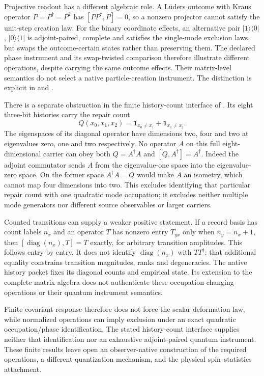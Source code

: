 Projective readout has a different algebraic role. A L\"uders outcome
with Kraus operator $P=P^\dagger=P^2$ has
$[PP^\dagger,P]=0$, so a nonzero projector cannot satisfy the unit-step
creation law. For the binary coordinate effects, an alternative pair
$|1\rangle\langle0|$, $|0\rangle\langle1|$ is adjoint-paired,
complete and satisfies the single-mode exclusion laws, but swaps the
outcome-certain states rather than preserving them. The declared phase
instrument and its swap-twisted comparison therefore illustrate
different operations, despite carrying the same outcome effects.
Their matrix-level semantics do not select a native particle-creation
instrument. The distinction is explicit in
 and
.

There is a separate obstruction in the finite history-count interface of
. Its eight three-bit histories
carry the repair count
\[
 Q(x_0,x_1,x_2)
  =\mathbf1_{x_0\ne x_1}+\mathbf1_{x_1\ne x_2}.
\]
The eigenspaces of its diagonal operator have dimensions two, four and
two at eigenvalues zero, one and two respectively. No operator $A$ on
this full eight-dimensional carrier can obey both
$Q=A^\dagger A$ and $[Q,A^\dagger]=A^\dagger$. Indeed the adjoint
commutator sends $A$ from the eigenvalue-one space into the eigenvalue-zero
space. On the former space $A^\dagger A=Q$ would make $A$ an isometry,
which cannot map four dimensions into two. This excludes identifying
that particular repair count with one quadratic mode occupation; it
excludes neither multiple mode generators nor different source
observables or larger carriers.

Counted transitions can supply a weaker positive statement. If a record
basis has count labels $n_x$ and an operator $T$ has nonzero entry
$T_{yx}$ only when $n_y=n_x+1$, then
$[\operatorname{diag}(n_x),T]=T$ exactly, for arbitrary transition
amplitudes. This follows entry by entry. It does not identify
$\operatorname{diag}(n_x)$ with $TT^\dagger$: that additional equality
constrains transition magnitudes, ranks and degeneracies. The native
history packet fixes its diagonal counts and empirical state. Its
extension to the complete matrix algebra does not authenticate these
occupation-changing operations or their quantum instrument semantics.

Finite covariant response therefore does not force the scalar deformation
law, while normalized operations
can imply exclusion under an exact quadratic occupation/phase
identification. The stated history-count interface supplies neither that identification
nor an exhaustive adjoint-paired quantum instrument. These finite
results leave open an observer-native construction of the required
operations, a different quantization mechanism, and the physical
spin--statistics attachment.
